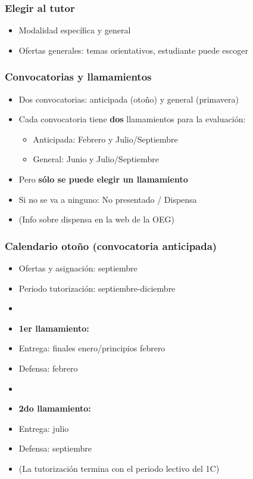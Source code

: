 \documentclass[aspectratio=43]{beamer}
\begin{document}
\begin{frame}
\frametitle{Elegir al \textbf{tutor}}
\centering

\begin{itemize}
  \item Modalidad específica y general
  \item Ofertas generales: temas orientativos, estudiante puede escoger
\end{itemize}

\end{frame}
  

\begin{frame}
\frametitle{Convocatorias y llamamientos}
\centering

\begin{itemize}
  \item Dos convocatorias: anticipada (otoño) y general (primavera)
  \item Cada convocatoria tiene \textbf{dos} llamamientos para la evaluación:
  \begin{itemize}
    \item Anticipada: Febrero y Julio/Septiembre
    \item General: Junio y Julio/Septiembre
  \end{itemize}
  \item Pero \textbf{sólo se puede elegir un llamamiento}
  \item Si no se va a ninguno: No presentado / Dispensa
  \item[] (Info sobre dispensa en la web de la OEG)
\end{itemize}

\end{frame}

\begin{frame}
\frametitle{Calendario otoño (convocatoria anticipada)}
\centering

\begin{itemize}
  \item Ofertas y asignación: septiembre
  \item Periodo tutorización: septiembre-diciembre
  \item[]
  \item \textbf{1er llamamiento:}
  \item[-] Entrega: finales enero/principios febrero
  \item[-] Defensa: febrero
  \item[]
  \item \textbf{2do llamamiento:}
  \item[-] Entrega: julio
  \item[-] Defensa: septiembre
  \item[] (La tutorización termina con el periodo lectivo del 1C)
\end{itemize}

\end{frame}
\end{document}
